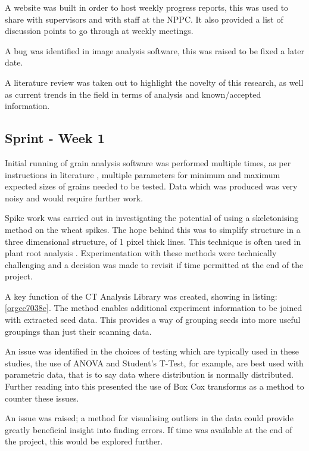 \documentclass[11pt]{report}
\begin{document}
A website was built in order to host weekly progress reports, this was used to share with supervisors and with staff at the NPPC. It also provided a list of discussion points to go through at weekly meetings.

A bug was identified in image analysis software, this was raised to be fixed a later date.

A literature review was taken out to highlight the novelty of this research, as well as current trends in the field in terms of analysis and known/accepted information.

\subsection{Sprint - Week 1}
\label{sec:orgb2c01e6}

Initial running of grain analysis software was performed multiple times, as per instructions in literature \cite{Hughes2017}, multiple parameters for minimum and maximum expected sizes of grains needed to be tested. Data which was produced was very noisy and would require further work.

Spike work was carried out in investigating the potential of using a skeletonising method on the wheat spikes. The hope behind this was to simplify structure in a three dimensional structure, of 1 pixel thick lines. This technique is often used in plant root analysis \cite{Mairhofer2015,Daly2017}. Experimentation with these methods were technically challenging and a decision was made to revisit if time permitted at the end of the project.

A key function of the CT Analysis Library was created, showing in listing:\ref{orgcc7038e}. The method enables additional experiment information to be joined with extracted seed data. This provides a way of grouping seeds into more useful groupings than just their scanning data.

An issue was identified in the choices of testing which are typically used in these studies, the use of ANOVA and Student's T-Test, for example, are best used with parametric data, that is to say data where distribution is normally distributed. Further reading into this presented the use of Box Cox transforms as a method to counter these issues.

An issue was raised; a method for visualising outliers in the data could provide greatly beneficial insight into finding errors. If time was available at the end of the project, this would be explored further.
\end{document}
